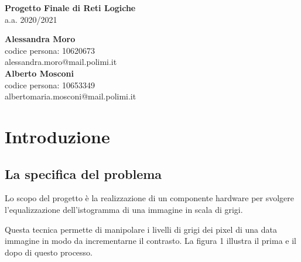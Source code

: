 \documentclass[11pt]{article}
\begin{document}
\begin{titlepage}
    
    \vspace*{2cm}
    
    \begin{center}
        \huge{\bfseries Progetto Finale di Reti Logiche} \\[10pt]
        \large{a.a. 2020/2021} \\
    \end{center}
    
    \vfill
    
    \begin{flushleft}
        \large
        \textbf{Alessandra Moro} \\
        \normalsize
        codice persona: 10620673 \\ 
        alessandra.moro@mail.polimi.it \\[5mm]
        
        \large
        \textbf{Alberto Mosconi} \\
        \normalsize
        codice persona: 10653349 \\
        albertomaria.mosconi@mail.polimi.it
    \end{flushleft}
    
\end{titlepage}

\thispagestyle{empty}
\tableofcontents
\newpage

\setcounter{page}{1}
\section{Introduzione}

    \subsection{La specifica del problema}

    Lo scopo del progetto è la realizzazione di un componente hardware per svolgere l'equalizzazione dell'istogramma di una immagine in scala di grigi.
    
    Questa tecnica permette di manipolare i livelli di grigi dei pixel di una data immagine in modo da incrementarne il contrasto. La figura 1 illustra il prima e il dopo di questo processo.
    
\end{document}
